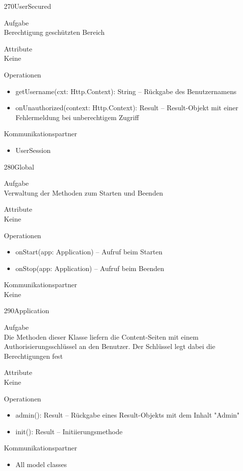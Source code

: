 \newpage
\begin{class}{270}{UserSecured}
\item[Aufgabe]~\\
Berechtigung geschützten Bereich
\item[Attribute]~\\
Keine
\item[Operationen]~\\
\begin{itemize}
\item getUsername(cxt: Http.Context): String -- Rückgabe des Benutzernamens
\item onUnauthorized(context: Http.Context): Result -- Result-Objekt mit einer Fehlermeldung bei unberechtigem Zugriff
\end{itemize}
\item[Kommunikationspartner]~\\
\begin{itemize}
\item UserSession
\end{itemize}
\end{class}

\newpage
\begin{class}{280}{Global}
\item[Aufgabe]~\\
Verwaltung der Methoden zum Starten und Beenden
\item[Attribute]~\\
Keine
\item[Operationen]~\\
\begin{itemize}
\item onStart(app: Application) -- Aufruf beim Starten
\item onStop(app: Application) -- Aufruf beim Beenden
\end{itemize}
\item[Kommunikationspartner]~\\
Keine
\end{class}

\newpage
\begin{class}{290}{Application}
\item[Aufgabe]~\\
Die Methoden dieser Klasse liefern die Content-Seiten mit einem Authorisierungsschlüssel an den Benutzer. Der Schlüssel legt dabei die Berechtigungen fest
\item[Attribute]~\\
Keine
\item[Operationen]~\\
\begin{itemize}
\item admin(): Result -- Rückgabe eines Result-Objekts mit dem Inhalt "Admin"
\item init(): Result -- Initiierungsmethode
\end{itemize}
\item[Kommunikationspartner]~\\
\begin{itemize}
\item All model classes
\end{itemize}
\end{class}

